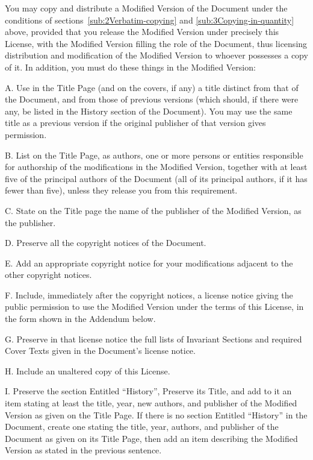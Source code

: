 You may copy and distribute a Modified Version of the Document under
the conditions of sections~\ref{sub:2Verbatim-copying} and \ref{sub:3Copying-in-quantity}
above, provided that you release the Modified Version under precisely
this License, with the Modified Version filling the role of the Document,
thus licensing distribution and modification of the Modified Version
to whoever possesses a copy of it. In addition, you must do these
things in the Modified Version:

A. Use in the Title Page (and on the covers, if any) a title distinct
from that of the Document, and from those of previous versions (which
should, if there were any, be listed in the History section of the
Document). You may use the same title as a previous version if the
original publisher of that version gives permission.

B. List on the Title Page, as authors, one or more persons or entities
responsible for authorship of the modifications in the Modified Version,
together with at least five of the principal authors of the Document
(all of its principal authors, if it has fewer than five), unless
they release you from this requirement.

C. State on the Title page the name of the publisher of the Modified
Version, as the publisher.

D. Preserve all the copyright notices of the Document.

E. Add an appropriate copyright notice for your modifications adjacent
to the other copyright notices.

F. Include, immediately after the copyright notices, a license notice
giving the public permission to use the Modified Version under the
terms of this License, in the form shown in the Addendum below.

G. Preserve in that license notice the full lists of Invariant Sections
and required Cover Texts given in the Document's license notice.

H. Include an unaltered copy of this License.

I. Preserve the section Entitled ``History'', Preserve its Title,
and add to it an item stating at least the title, year, new authors,
and publisher of the Modified Version as given on the Title Page.
If there is no section Entitled ``History'' in the Document, create
one stating the title, year, authors, and publisher of the Document
as given on its Title Page, then add an item describing the Modified
Version as stated in the previous sentence.

